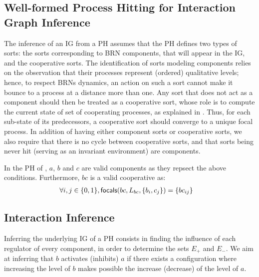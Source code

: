 \subsection{Well-formed Process Hitting for Interaction Graph Inference}\label{ssec:wf}

The inference of an IG from a PH assumes that the PH defines two types of sorts: the sorts corresponding to BRN components, that will appear in the IG, and the cooperative sorts.
The identification of sorts modeling components relies on the observation that their processes represent (ordered) qualitative levels;
hence, to respect BRNs dynamics, an action on such a sort cannot make it bounce to a process at a distance more than one.
Any sort that does not act as a component should then be treated as a cooperative sort, whose role is to compute the current state of set of cooperating processes, as explained in .
Thus, for each sub-state of its predecessors, a cooperative sort should converge to a unique focal process.
In addition of having either component sorts or cooperative sorts, we also require that there is no cycle between cooperative sorts, and that sorts being never hit (\ie serving as an invariant environment) are components.

\begin{example*}
In the PH of ,
$a$, $b$ and $c$ are valid components as they repsect the above conditions.
Furthermore, $bc$ is a valid cooperative as:
\begin{align*}
\forall i, j \in \{0, 1\}, \mathsf{focals}(bc, L_{bc}, \{b_i, c_j\}) &= \{bc_{ij}\}
\end{align*}
\end{example*}



\subsection{Interaction Inference}\label{ssec:infer-IG}

Inferring the underlying IG of a PH consists in finding the influence of each regulator of every component, in order to determine the sets $E_+$ and $E_-$.
We aim at inferring that $b$ activates (inhibits) $a$ if there exists a configuration where increasing the level of $b$ makes possible the increase (decrease) of the level of $a$.


